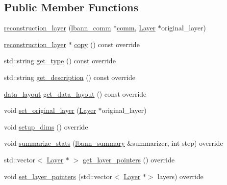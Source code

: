 \subsection*{Public Member Functions}
\begin{DoxyCompactItemize}
\item 
\hyperlink{classlbann_1_1reconstruction__layer_a8850ac54a21d11de778ad6a442f80ae1}{reconstruction\+\_\+layer} (\hyperlink{classlbann_1_1lbann__comm}{lbann\+\_\+comm} $\ast$\hyperlink{file__io_8cpp_ab048c6f9fcbcfaa57ce68b00263dbebe}{comm}, \hyperlink{classlbann_1_1Layer}{Layer} $\ast$original\+\_\+layer)
\item 
\hyperlink{classlbann_1_1reconstruction__layer}{reconstruction\+\_\+layer} $\ast$ \hyperlink{classlbann_1_1reconstruction__layer_a7f6587284527a50475bf1cc0868fa595}{copy} () const override
\item 
std\+::string \hyperlink{classlbann_1_1reconstruction__layer_a5f3bced2474caea9b728639633ac25ce}{get\+\_\+type} () const override
\item 
std\+::string \hyperlink{classlbann_1_1reconstruction__layer_a738c3f06ea3cee1e8b11672fde6b594e}{get\+\_\+description} () const override
\item 
\hyperlink{base_8hpp_a786677cbfb3f5677b4d84f3056eb08db}{data\+\_\+layout} \hyperlink{classlbann_1_1reconstruction__layer_a7516698ae3de4cea311ec17685a0b60a}{get\+\_\+data\+\_\+layout} () const override
\item 
void \hyperlink{classlbann_1_1reconstruction__layer_a57e3d25871c8472c5a8de71537fdedff}{set\+\_\+original\+\_\+layer} (\hyperlink{classlbann_1_1Layer}{Layer} $\ast$original\+\_\+layer)
\item 
void \hyperlink{classlbann_1_1reconstruction__layer_a3abb27b670b5c57f2a6b1d669a7de508}{setup\+\_\+dims} () override
\item 
void \hyperlink{classlbann_1_1reconstruction__layer_a09bf00610af66810bf8bbb65424d1e1a}{summarize\+\_\+stats} (\hyperlink{classlbann_1_1lbann__summary}{lbann\+\_\+summary} \&summarizer, int step) override
\item 
std\+::vector$<$ \hyperlink{classlbann_1_1Layer}{Layer} $\ast$ $>$ \hyperlink{classlbann_1_1reconstruction__layer_a52f5ebe2f2716b8cab5e768b1b82c3d0}{get\+\_\+layer\+\_\+pointers} () override
\item 
void \hyperlink{classlbann_1_1reconstruction__layer_a663b2810780ee2b0817f611a00b0b07f}{set\+\_\+layer\+\_\+pointers} (std\+::vector$<$ \hyperlink{classlbann_1_1Layer}{Layer} $\ast$$>$ layers) override
\end{DoxyCompactItemize}
